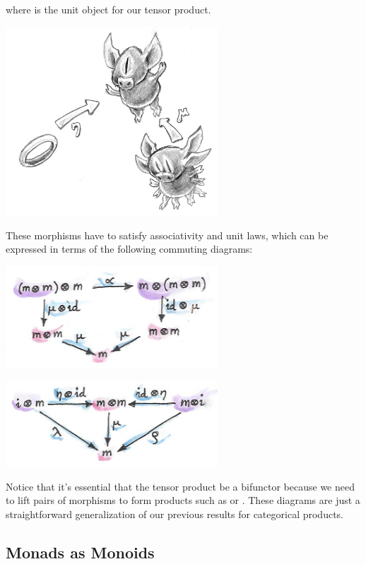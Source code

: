 where  is the unit object for our tensor product.

\includegraphics[width=3.12500in]{images/monoid-1.jpg}

These morphisms have to satisfy associativity and unit laws, which can
be expressed in terms of the following commuting diagrams:

\includegraphics[width=3.12500in]{images/assoctensor.jpg}

\includegraphics[width=3.12500in]{images/unitmon.jpg}

Notice that it's essential that the tensor product be a bifunctor
because we need to lift pairs of morphisms to form products such as
 or . These diagrams are just a
straightforward generalization of our previous results for categorical
products.

\subsection{Monads as Monoids}\label{monads-as-monoids}

